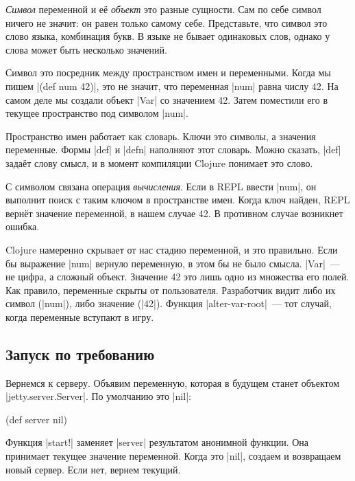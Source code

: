 
\emph{Символ} переменной и е\"{е} \emph{объект} это разные сущности. Сам по себе
символ ничего не значит: он равен только самому себе. Представьте, что символ
это слово языка, комбинация букв. В языке не бывает одинаковых слов, однако у
слова может быть несколько значений.


Символ это посредник между пространством имен и переменными. Когда мы пишем
\spverb|(def num 42)|, это не значит, что переменная \spverb|num| равна числу
42. На самом деле мы создали объект \spverb|Var| со значением 42. Затем
поместили его в текущее пространство под символом \spverb|num|.

Пространство имен работает как словарь. Ключи это символы, а значения
переменные. Формы \spverb|def| и \spverb|defn| наполняют этот словарь. Можно
сказать, \spverb|def| зада\"{е}т слову смысл, и в момент компиляции Clojure
понимает это слово.

С символом связана операция \emph{вычисления}. Если в REPL ввести \spverb|num|,
он выполнит поиск с таким ключом в пространстве имен. Когда ключ найден, REPL
верн\"{е}т значение переменной, в нашем случае 42. В противном случае возникнет
ошибка.

Clojure намеренно скрывает от нас стадию переменной, и это правильно. Если бы
выражение \spverb|num| вернуло переменную, в этом бы не было смысла. \spverb|Var|~---
не цифра, а сложный объект. Значение 42 это лишь одно из множества его полей.
Как правило, переменные скрыты от пользователя. Разработчик видит либо их символ
(\spverb|num|), либо значение (\spverb|42|). Функция \spverb|alter-var-root|~---
тот случай, когда переменные вступают в игру.

\subsection{Запуск по требованию}

Вернемся к серверу. Объявим переменную, которая в будущем станет объектом
\spverb|jetty.server.Server|. По умолчанию это \spverb|nil|:

\begin{english}
  \begin{clojure}
(def server nil)
  \end{clojure}
\end{english}

Функция \spverb|start!| заменяет \spverb|server| результатом анонимной
функции. Она принимает текущее значение переменной. Когда это \spverb|nil|,
создаем и возвращаем новый сервер. Если нет, вернем текущий.

